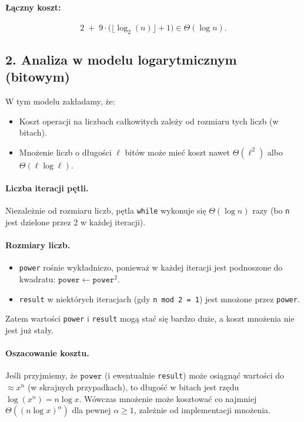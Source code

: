 \documentclass[12pt]{article}
\begin{document}
\paragraph{Łączny koszt:}
\[
2 \;+\; 9 \cdot \bigl(\lfloor \log_2(n) \rfloor + 1\bigr) 
\in \Theta(\log n).
\]

\subsection*{2. Analiza w modelu logarytmicznym (bitowym)}

W tym modelu zakładamy, że:
\begin{itemize}
    \item Koszt operacji na liczbach całkowitych zależy od rozmiaru tych liczb (w bitach).
    \item Mnożenie liczb o długości \(\ell\) bitów może mieć koszt nawet \(\Theta(\ell^2)\) albo \(\Theta(\ell \log \ell)\).
\end{itemize}

\paragraph{Liczba iteracji pętli.}
Niezależnie od rozmiaru liczb, pętla \texttt{while} wykonuje się \(\Theta(\log n)\) razy (bo \texttt{n} jest dzielone przez 2 w każdej iteracji).

\paragraph{Rozmiary liczb.}
\begin{itemize}
    \item \texttt{power} rośnie wykładniczo, ponieważ w każdej iteracji jest podnoszone do kwadratu: \(\texttt{power} \leftarrow \texttt{power}^2\).
    \item \texttt{result} w niektórych iteracjach (gdy \texttt{n mod 2 = 1}) jest mnożone przez \texttt{power}.
\end{itemize}
Zatem wartości \texttt{power} i \texttt{result} mogą stać się bardzo duże, a koszt mnożenia nie jest już stały.

\paragraph{Oszacowanie kosztu.}
Jeśli przyjmiemy, że \(\texttt{power}\) (i ewentualnie \texttt{result}) może osiągnąć wartości do \(\approx x^n\) (w skrajnych przypadkach), to długość w bitach jest rzędu \(\log (x^n) = n \log x\). Wówczas mnożenie może kosztować co najmniej \(\Theta((n \log x)^\alpha)\) dla pewnej \(\alpha \ge 1\), zależnie od implementacji mnożenia. 
\end{document}

